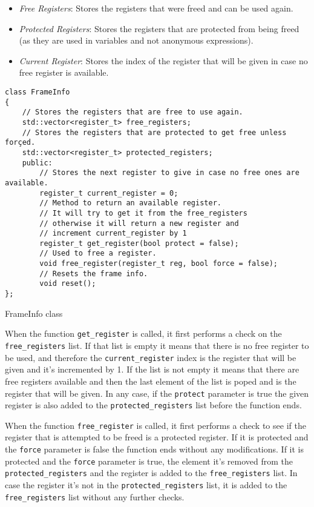 \begin{itemize}
    \item \emph{Free Registers}: Stores the registers that were freed and can be used again.
    \item \emph{Protected Registers}: Stores the registers that are protected from being freed (as they are used in variables and not anonymous expressions).
    \item \emph{Current Register}: Stores the index of the register that will be given in case no free register is available.
\end{itemize}

\begin{listing}[H]
\begin{verbatim}
class FrameInfo
{
    // Stores the registers that are free to use again.
    std::vector<register_t> free_registers;
    // Stores the registers that are protected to get free unless forçed.
    std::vector<register_t> protected_registers;
    public:
        // Stores the next register to give in case no free ones are available.
        register_t current_register = 0;
        // Method to return an available register.
        // It will try to get it from the free_registers
        // otherwise it will return a new register and
        // increment current_register by 1
        register_t get_register(bool protect = false);
        // Used to free a register.
        void free_register(register_t reg, bool force = false);
        // Resets the frame info.
        void reset();
};
\end{verbatim}
\caption{FrameInfo class}
\label{ls:frame_info_class}
\end{listing}

When the function \texttt{get\_register} is called, it first performs a check on the \texttt{free\_registers} list. If that list is empty it means
that there is no free register to be used, and therefore the \texttt{current\_register} index is the register that will be given and it's incremented by 1.
If the list is not empty it means that there are free registers available and then the last element of the list is poped and is the register that will be given.
In any case, if the \texttt{protect} parameter is true the given register is also added to the \texttt{protected\_registers} list before the function ends.

When the function \texttt{free\_register} is called, it first performs a check to see if the register that is attempted to be freed is a protected register.
If it is protected and the \texttt{force} parameter is false the function ends without any modifications. If it is protected and the \texttt{force} parameter
is true, the element it's removed from the \texttt{protected\_registers} and the register is added to the \texttt{free\_registers} list. In case the register
it's not in the \texttt{protected\_registers} list, it is added to the \texttt{free\_registers} list without any further checks.

